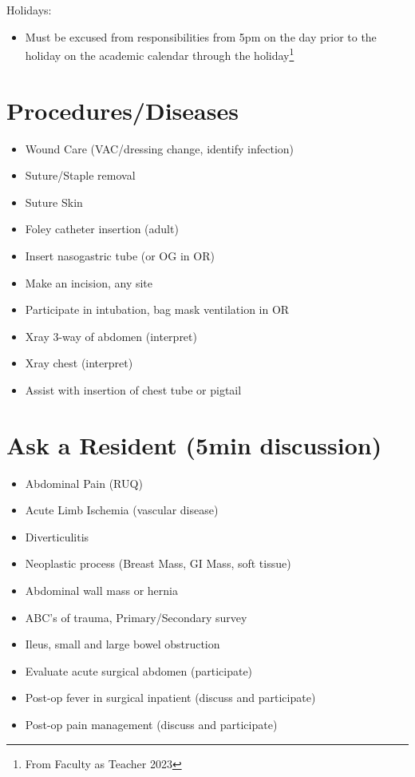 \documentclass[
]{book}
\providecommand{\tightlist}{%
  \setlength{\itemsep}{0pt}\setlength{\parskip}{0pt}}
\begin{document}
Holidays:

\begin{itemize}
\tightlist
\item
  Must be excused from responsibilities from 5pm on the day prior to the holiday on the academic calendar through the holiday\footnote{From Faculty as Teacher 2023}
\end{itemize}

\hypertarget{proceduresdiseases}{%
\section{Procedures/Diseases}\label{proceduresdiseases}}

\begin{itemize}
\tightlist
\item
  Wound Care (VAC/dressing change, identify infection)
\item
  Suture/Staple removal
\item
  Suture Skin
\item
  Foley catheter insertion (adult)
\item
  Insert nasogastric tube (or OG in OR)
\item
  Make an incision, any site
\item
  Participate in intubation, bag mask ventilation in OR
\item
  Xray 3-way of abdomen (interpret)
\item
  Xray chest (interpret)
\item
  Assist with insertion of chest tube or pigtail
\end{itemize}

\hypertarget{ask-a-resident-5min-discussion}{%
\section{Ask a Resident (5min discussion)}\label{ask-a-resident-5min-discussion}}

\begin{itemize}
\tightlist
\item
  Abdominal Pain (RUQ)
\item
  Acute Limb Ischemia (vascular disease)
\item
  Diverticulitis
\item
  Neoplastic process (Breast Mass, GI Mass, soft tissue)
\item
  Abdominal wall mass or hernia
\item
  ABC's of trauma, Primary/Secondary survey
\item
  Ileus, small and large bowel obstruction
\item
  Evaluate acute surgical abdomen (participate)
\item
  Post-op fever in surgical inpatient (discuss and participate)
\item
  Post-op pain management (discuss and participate)
\end{itemize}
\end{document}
